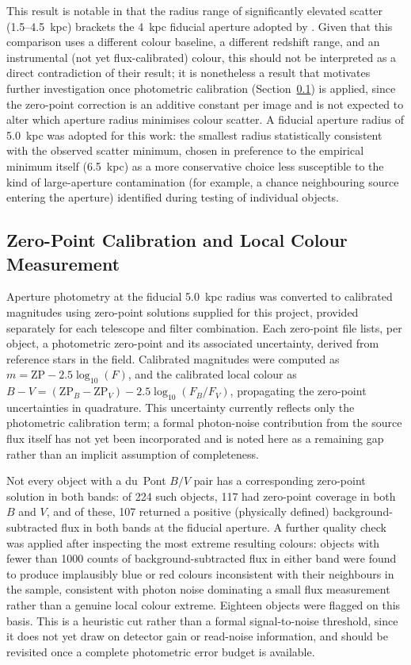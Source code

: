 \documentclass[12pt]{article}
\begin{document}
This result is notable in that the radius range of significantly elevated scatter (1.5--4.5~kpc) brackets the 4~kpc fiducial aperture adopted by \citet{Kelsey2021}. Given that this comparison uses a different colour baseline, a different redshift range, and an instrumental (not yet flux-calibrated) colour, this should not be interpreted as a direct contradiction of their result; it is nonetheless a result that motivates further investigation once photometric calibration (Section~\ref{sec:zeropoint_calibration}) is applied, since the zero-point correction is an additive constant per image and is not expected to alter which aperture radius minimises colour scatter. A fiducial aperture radius of 5.0~kpc was adopted for this work: the smallest radius statistically consistent with the observed scatter minimum, chosen in preference to the empirical minimum itself (6.5~kpc) as a more conservative choice less susceptible to the kind of large-aperture contamination (for example, a chance neighbouring source entering the aperture) identified during testing of individual objects.

\subsection{Zero-Point Calibration and Local Colour Measurement}
\label{sec:zeropoint_calibration}

Aperture photometry at the fiducial 5.0~kpc radius was converted to calibrated magnitudes using zero-point solutions supplied for this project, provided separately for each telescope and filter combination. Each zero-point file lists, per object, a photometric zero-point and its associated uncertainty, derived from reference stars in the field. Calibrated magnitudes were computed as $m = \mathrm{ZP} - 2.5\log_{10}(F)$, and the calibrated local colour as $B - V = (\mathrm{ZP}_B - \mathrm{ZP}_V) - 2.5\log_{10}(F_B/F_V)$, propagating the zero-point uncertainties in quadrature. This uncertainty currently reflects only the photometric calibration term; a formal photon-noise contribution from the source flux itself has not yet been incorporated and is noted here as a remaining gap rather than an implicit assumption of completeness.

Not every object with a du~Pont $B/V$ pair has a corresponding zero-point solution in both bands: of 224 such objects, 117 had zero-point coverage in both $B$ and $V$, and of these, 107 returned a positive (physically defined) background-subtracted flux in both bands at the fiducial aperture. A further quality check was applied after inspecting the most extreme resulting colours: objects with fewer than 1000 counts of background-subtracted flux in either band were found to produce implausibly blue or red colours inconsistent with their neighbours in the sample, consistent with photon noise dominating a small flux measurement rather than a genuine local colour extreme. Eighteen objects were flagged on this basis. This is a heuristic cut rather than a formal signal-to-noise threshold, since it does not yet draw on detector gain or read-noise information, and should be revisited once a complete photometric error budget is available.
\end{document}
